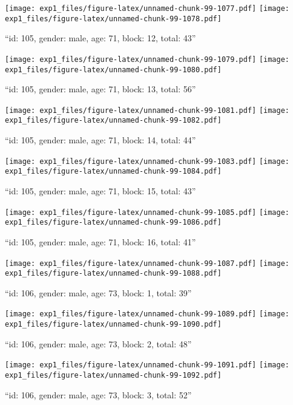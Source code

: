 \documentclass[,]{article}
\begin{document}
\texttt{[image: exp1\_files/figure-latex/unnamed-chunk-99-1077.pdf]}
\texttt{[image: exp1\_files/figure-latex/unnamed-chunk-99-1078.pdf]}

\newpage
[1] 

``id: 105, gender: male, age: 71, block: 12, total: 43''

\texttt{[image: exp1\_files/figure-latex/unnamed-chunk-99-1079.pdf]}
\texttt{[image: exp1\_files/figure-latex/unnamed-chunk-99-1080.pdf]}

\newpage
[1] 

``id: 105, gender: male, age: 71, block: 13, total: 56''

\texttt{[image: exp1\_files/figure-latex/unnamed-chunk-99-1081.pdf]}
\texttt{[image: exp1\_files/figure-latex/unnamed-chunk-99-1082.pdf]}

\newpage
[1] 

``id: 105, gender: male, age: 71, block: 14, total: 44''

\texttt{[image: exp1\_files/figure-latex/unnamed-chunk-99-1083.pdf]}
\texttt{[image: exp1\_files/figure-latex/unnamed-chunk-99-1084.pdf]}

\newpage
[1] 

``id: 105, gender: male, age: 71, block: 15, total: 43''

\texttt{[image: exp1\_files/figure-latex/unnamed-chunk-99-1085.pdf]}
\texttt{[image: exp1\_files/figure-latex/unnamed-chunk-99-1086.pdf]}

\newpage
[1] 

``id: 105, gender: male, age: 71, block: 16, total: 41''

\texttt{[image: exp1\_files/figure-latex/unnamed-chunk-99-1087.pdf]}
\texttt{[image: exp1\_files/figure-latex/unnamed-chunk-99-1088.pdf]}

\newpage
[1] 

``id: 106, gender: male, age: 73, block: 1, total: 39''

\texttt{[image: exp1\_files/figure-latex/unnamed-chunk-99-1089.pdf]}
\texttt{[image: exp1\_files/figure-latex/unnamed-chunk-99-1090.pdf]}

\newpage
[1] 

``id: 106, gender: male, age: 73, block: 2, total: 48''

\texttt{[image: exp1\_files/figure-latex/unnamed-chunk-99-1091.pdf]}
\texttt{[image: exp1\_files/figure-latex/unnamed-chunk-99-1092.pdf]}

\newpage
[1] 

``id: 106, gender: male, age: 73, block: 3, total: 52''
\end{document}
